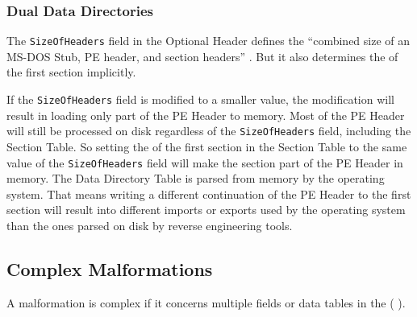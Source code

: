 \subsubsection*{Dual Data Directories}

The \texttt{SizeOfHeaders} field in the Optional Header defines the \enquote{combined size of an MS-DOS Stub, PE header, and section headers} \cite[]{pespec}. But it also determines the \VA{} of the first section implicitly. \cite[slide 15]{vuksan11} 

If the \texttt{SizeOfHeaders} field is modified to a smaller value, the modification will result in loading only part of the PE Header to memory. Most of the PE Header will still be processed on disk regardless of the \texttt{SizeOfHeaders} field, including the Section Table. So setting the \VA{} of the first section in the Section Table to the same value of the \texttt{SizeOfHeaders} field will make the section part of the PE Header in memory. 
The Data Directory Table is parsed from memory by the operating system. That means writing a different continuation of the PE Header to the first section will result into \eg{} different imports or exports used by the operating system than the ones parsed on disk by reverse engineering tools.


\subsection{Complex Malformations}

A malformation is complex if it concerns multiple fields or data tables in the \PE{} (\cf{} \cite[slide 7]{vuksan11}).
